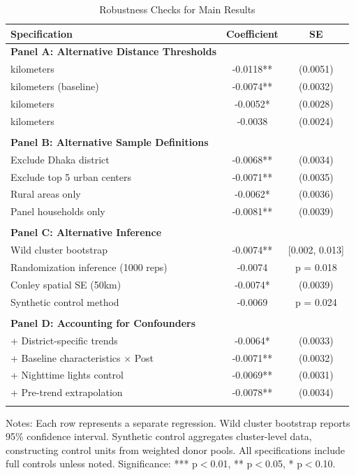 \documentclass[12pt]{article}
\begin{document}
\begin{table}[H]
\centering
\caption{Robustness Checks for Main Results}
\label{tab:robustness}
\begin{threeparttable}
\begin{tabular}{lcc}
\toprule
Specification & Coefficient & SE \\
\midrule
\textbf{Panel A: Alternative Distance Thresholds} & & \\
\quad 5 kilometers & -0.0118** & (0.0051) \\
\quad 10 kilometers (baseline) & -0.0074** & (0.0032) \\
\quad 15 kilometers & -0.0052* & (0.0028) \\
\quad 20 kilometers & -0.0038 & (0.0024) \\
& & \\
\textbf{Panel B: Alternative Sample Definitions} & & \\
\quad Exclude Dhaka district & -0.0068** & (0.0034) \\
\quad Exclude top 5 urban centers & -0.0071** & (0.0035) \\
\quad Rural areas only & -0.0062* & (0.0036) \\
\quad Panel households only & -0.0081** & (0.0039) \\
& & \\
\textbf{Panel C: Alternative Inference} & & \\
\quad Wild cluster bootstrap & -0.0074** & [0.002, 0.013] \\
\quad Randomization inference (1000 reps) & -0.0074 & p = 0.018 \\
\quad Conley spatial SE (50km) & -0.0074* & (0.0039) \\
\quad Synthetic control method & -0.0069 & p = 0.024 \\
& & \\
\textbf{Panel D: Accounting for Confounders} & & \\
\quad + District-specific trends & -0.0064* & (0.0033) \\
\quad + Baseline characteristics × Post & -0.0071** & (0.0032) \\
\quad + Nighttime lights control & -0.0069** & (0.0031) \\
\quad + Pre-trend extrapolation & -0.0078** & (0.0034) \\
\\
\bottomrule
\end{tabular}
\begin{tablenotes}
\footnotesize
\item Notes: Each row represents a separate regression. Wild cluster bootstrap reports 95\% confidence interval. Synthetic control aggregates cluster-level data, constructing control units from weighted donor pools. All specifications include full controls unless noted. Significance: *** p$<$0.01, ** p$<$0.05, * p$<$0.10.
\end{tablenotes}
\end{threeparttable}
\end{table}
\end{document}
